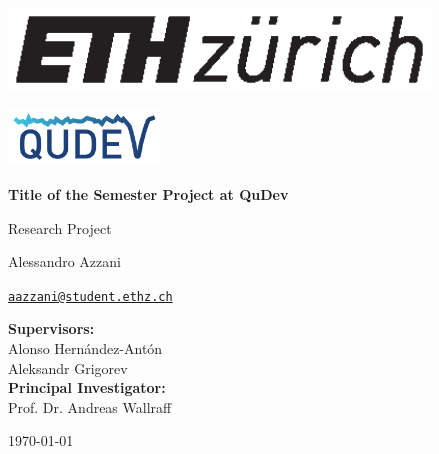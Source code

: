 \begin{titlepage}
    \noindent
    \begin{minipage}{0.4\textwidth}
        \begin{flushleft}
            \includegraphics[height=2.2cm]{Title/eth_logo.eps}
        \end{flushleft}
    \end{minipage}
    \hfill
    \begin{minipage}{0.4\textwidth}
        \begin{flushright}
            \includegraphics[height=1.5cm]{Title/Qudev_logo.png} %
        \end{flushright}
    \end{minipage}

    \vspace{3cm}

    \begin{center}
        \begin{spacing}{2.0}
            {\huge \bfseries Title of the Semester Project at QuDev}
        \end{spacing}

        \large
        Research Project {\MakeUppercase{}}
    \end{center}

    \vspace{1.2cm}

    \begin{center}
        \large
        Alessandro Azzani

        \begingroup
            \hypersetup{urlcolor=black}
            \href{mailto:aazzani@student.ethz.ch}
            {\texttt{\small aazzani@student.ethz.ch}} 
        \endgroup
    \end{center}

    \vfill

    \begin{center}
        \textbf{Supervisors:} \\
        Alonso Hernández-Antón \\
        Aleksandr Grigorev \\

        \vspace{0.3cm}
        \textbf{Principal Investigator:} \\
        Prof. Dr. Andreas Wallraff
    \end{center}

    \vspace{0.5cm}

    \begin{center}
        \today
    \end{center}
\end{titlepage}